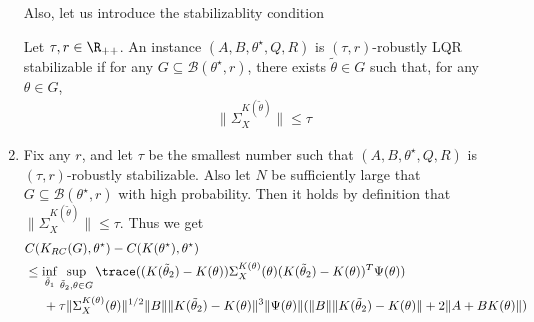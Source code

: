 \begin{enumerate}
Also, let us introduce the stabilizablity condition
\begin{definition}
    Let $\tau, r\in\R_{++}$. An instance $(A, B, \theta^\star, Q, R)$ is $(\tau,r)$-robustly LQR stabilizable if for any $G\subseteq\mathcal{B}(\theta^{\star}, r)$, there exists $\tilde\theta\in G$ such that, for any $\theta\in G$, 
    \begin{align*}
        \|\Sigma_X^{K(\tilde\theta)}\|\leq\tau
    \end{align*}
\end{definition}

\item Fix any $r$, and let $\tau$ be the smallest number such that $(A, B, \theta^\star, Q, R)$ is $(\tau, r)$-robustly stabilizable. Also let $N$ be sufficiently large that $G\subseteq\mathcal{B}(\theta^{\star}, r)$ with high probability. Then it holds by definition that $ \|\Sigma_X^{K(\tilde\theta)}\|\leq\tau$. Thus we get
\begin{align*}
    &C(K_{RC}(G), \theta^\star) - C(K(\theta^\star), \theta^\star) \\
    &\leq \inf_{\tilde\theta_1}\sup_{\tilde\theta_2, \theta\in G} \trace ((K(\tilde\theta_2)-K(\theta))\Sigma_X^{K(\theta)}(\theta)(K(\tilde\theta_2)-K(\theta))^T\Psi(\theta)) \\
    &\hspace{5mm}+ \tau\|\Sigma_X^{K(\theta)}(\theta)\|^{1/2}\|B\|\|K(\tilde\theta_2)-K(\theta)\|^3\|\Psi(\theta)\|(\|B\|\|K(\tilde\theta_2)-K(\theta)\| + 2\|A+BK(\theta)\|)
\end{align*}


\end{enumerate}
